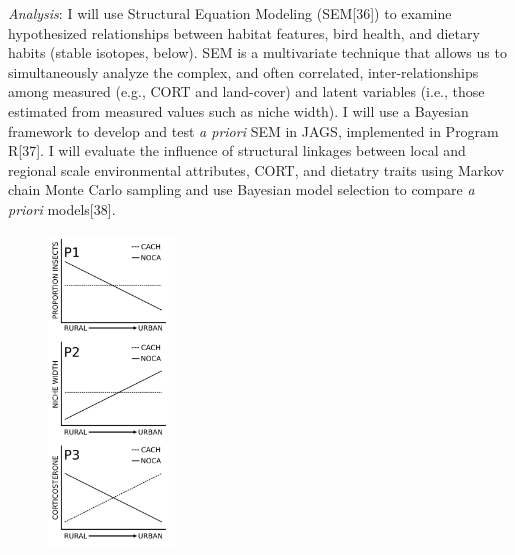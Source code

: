 \documentclass[12pt]{article}
\begin{document}
\textit{Analysis}: I will use Structural Equation Modeling (SEM[36]) to examine hypothesized relationships between habitat features, bird health, and dietary habits (stable isotopes, below). SEM is a multivariate technique that allows us to simultaneously analyze the complex, and often correlated, inter-relationships among measured (e.g., CORT and land-cover) and latent variables (i.e., those estimated from measured values such as niche width). I will use a Bayesian framework to develop and test \textit{a priori} SEM in JAGS, implemented in Program R[37]. I will evaluate the influence of structural linkages between local and regional scale environmental attributes, CORT, and dietatry traits using Markov chain Monte Carlo sampling and use Bayesian model selection to compare \textit{a priori} models[38]. 
\begin{figure}
   \centering
    \includegraphics[width=0.3\textwidth]{predictionsPlot}
\end{figure}
\end{document}
